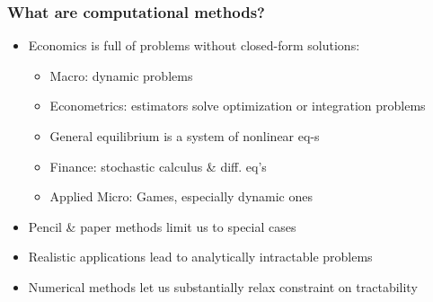 \documentclass[bigger]{beamer}
\begin{document}
\begin{frame}%

\frametitle{What are computational methods?}

\begin{itemize}
\item Economics is full of problems without closed-form solutions:

\begin{itemize}
\item Macro: dynamic problems

\item Econometrics: estimators solve optimization or integration problems

\item General equilibrium is a system of nonlinear eq-s

\item Finance: stochastic calculus \& diff. eq's

\item Applied Micro: Games, especially dynamic ones
\end{itemize}

\item Pencil \& paper methods limit us to special cases

\item Realistic applications lead to analytically intractable problems

\item Numerical methods let us substantially relax constraint on tractability
\end{itemize}


\end{frame}%
\end{document}
